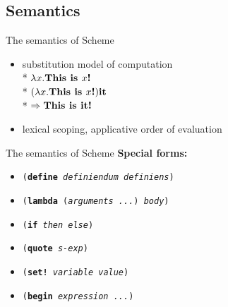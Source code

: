\documentclass{beamer}
\begin{document}
\subsection{Semantics}

\begin{frame}{The semantics of Scheme}
  \begin{itemize}
    \pause
  \item substitution model of computation \\*
    \pause $\lambda x . \text{\textbf{This is }} x \text{\textbf{!}}$ \\*
    \pause $(\lambda x . \text{\textbf{This is }} x \text{\textbf{!}})
    \text{\textbf{it}}$ \\*
    \pause $\Rightarrow \text{\textbf{This is it!}}$ \pause
  \item lexical scoping, applicative order of evaluation
  \end{itemize}
\end{frame}

\begin{frame}{The semantics of Scheme}
  \textbf{Special forms:}
  \begin{itemize}
    \pause
  \item \texttt{(\textbf{define} \textit{definiendum} \textit{definiens})}
    \pause
  \item \texttt{(\textbf{lambda} (\textit{arguments ...}) \textit{body})}
    \pause
  \item \texttt{(\textbf{if} \textit{then} \textit{else})}
    \pause
  \item \texttt{(\textbf{quote} \textit{s-exp})}
    \pause
  \item \texttt{(\textbf{set!} \textit{variable} \textit{value})}
    \pause
  \item \texttt{(\textbf{begin} \textit{expression ...})}
  \end{itemize}
\end{frame}


\end{document}
